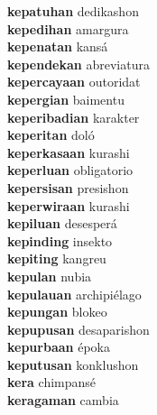 \textbf{kepatuhan } dedikashon \\
\textbf{kepedihan } amargura \\
\textbf{kepenatan } kansá \\
\textbf{kependekan } abreviatura \\
\textbf{kepercayaan } outoridat \\
\textbf{kepergian } baimentu \\
\textbf{keperibadian } karakter \\
\textbf{keperitan } doló \\
\textbf{keperkasaan } kurashi \\
\textbf{keperluan } obligatorio \\
\textbf{kepersisan } presishon \\
\textbf{keperwiraan } kurashi \\
\textbf{kepiluan } desesperá \\
\textbf{kepinding } insekto \\
\textbf{kepiting } kangreu \\
\textbf{kepulan } nubia \\
\textbf{kepulauan } archipiélago \\
\textbf{kepungan } blokeo \\
\textbf{kepupusan } desaparishon \\
\textbf{kepurbaan } époka \\
\textbf{keputusan } konklushon \\
\textbf{kera } chimpansé \\
\textbf{keragaman } cambia \\
